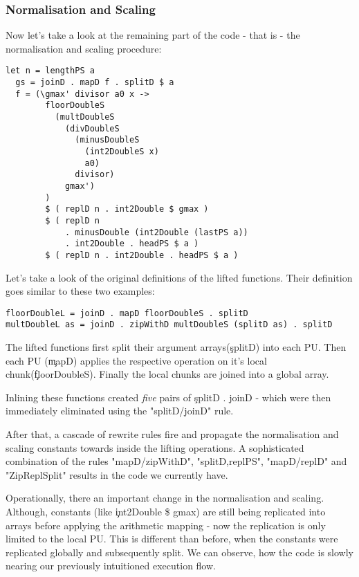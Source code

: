     \subsubsection{Normalisation and Scaling}
    
    Now let's take a look at the remaining part of the code - that is - the
    normalisation and scaling procedure:
    
    \begin{lstlisting}
let n = lengthPS a
  gs = joinD . mapD f . splitD $ a
  f = (\gmax' divisor a0 x ->
        floorDoubleS
          (multDoubleS
            (divDoubleS
              (minusDoubleS
                (int2DoubleS x)
                a0)
              divisor)
            gmax')
        )
        $ ( replD n . int2Double $ gmax )
        $ ( replD n
            . minusDouble (int2Double (lastPS a))
            . int2Double . headPS $ a )
        $ ( replD n . int2Double . headPS $ a )
    \end{lstlisting}
    Let's take a look of the original definitions of the lifted functions. Their definition goes similar to these two examples:
    \begin{lstlisting}
floorDoubleL = joinD . mapD floorDoubleS . splitD
multDoubleL as = joinD . zipWithD multDoubleS (splitD as) . splitD
    \end{lstlisting}
    The lifted functions first split their argument arrays(\c{splitD}) into each PU.
    Then each PU (\c{mapD}) applies the respective operation on it's local chunk(\c{floorDoubleS}).
    Finally the local chunks are joined into a global array.
    
    Inlining these functions created \emph{five} pairs of \c{splitD . joinD} - which were then immediately
    eliminated using the "splitD/joinD" rule.
    
    After that, a cascade of rewrite rules fire and propagate the normalisation and scaling
    constants towards inside the lifting operations. A sophisticated combination of the rules
    "mapD/zipWithD", "splitD,replPS", "mapD/replD" and "ZipReplSplit" results in
    the code we currently have.
    
    Operationally, there an important change in the normalisation and scaling.
    Although, constants (like \c{int2Double \$ gmax}) are still being replicated into arrays
    before applying the arithmetic mapping - now the replication
    is only limited to the local PU. This is different than before, when
    the constants were replicated globally and subsequently split.
    We can observe, how the code is slowly nearing our previously intuitioned execution flow.
    
